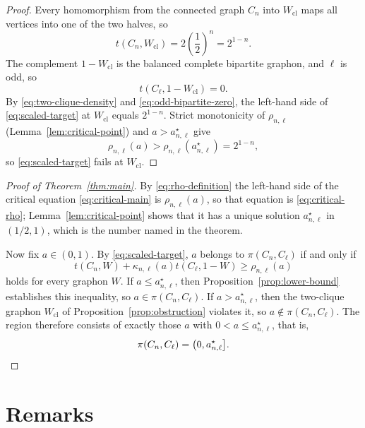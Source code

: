 \documentclass[11pt]{article}
\theoremstyle{definition}
\theoremstyle{remark}
\begin{document}
\begin{proof}
  Every homomorphism from the connected graph $C_n$ into $W_{\mathrm{cl}}$
  maps all vertices into one of the two halves, so
  \begin{equation}
    t(C_n,W_{\mathrm{cl}})
    =2\left(\frac12\right)^n
    =2^{1-n}.
    \label{eq:two-clique-density}
  \end{equation}
  The complement $1-W_{\mathrm{cl}}$ is the balanced complete bipartite
  graphon, and $\ell$ is odd, so
  \begin{equation}
    t(C_\ell,1-W_{\mathrm{cl}})=0.
    \label{eq:odd-bipartite-zero}
  \end{equation}
  By \eqref{eq:two-clique-density} and \eqref{eq:odd-bipartite-zero}, the
  left-hand side of \eqref{eq:scaled-target} at $W_{\mathrm{cl}}$ equals
  $2^{1-n}$.  Strict monotonicity of $\rho_{n,\ell}$
  (Lemma~\ref{lem:critical-point}) and $a>a_{n,\ell}^{\star}$ give
  \[
    \rho_{n,\ell}(a)
    >\rho_{n,\ell}(a_{n,\ell}^{\star})
    =2^{1-n},
  \]
  so \eqref{eq:scaled-target} fails at $W_{\mathrm{cl}}$.
\end{proof}

\begin{proof}[Proof of Theorem~\ref{thm:main}]
  By \eqref{eq:rho-definition} the left-hand side of the critical equation
  \eqref{eq:critical-main} is $\rho_{n,\ell}(a)$, so that equation is
  \eqref{eq:critical-rho}; Lemma~\ref{lem:critical-point} shows that it has a
  unique solution $a_{n,\ell}^{\star}$ in $(1/2,1)$, which is the number
  named in the theorem.

  Now fix $a\in(0,1)$.  By \eqref{eq:scaled-target}, $a$ belongs to
  $\pi(C_n,C_\ell)$ if and only if
  \[
    t(C_n,W)+\kappa_{n,\ell}(a)t(C_\ell,1-W)\ge\rho_{n,\ell}(a)
  \]
  holds for every graphon $W$.  If $a\le a_{n,\ell}^{\star}$, then
  Proposition~\ref{prop:lower-bound} establishes this inequality, so
  $a\in\pi(C_n,C_\ell)$.  If $a>a_{n,\ell}^{\star}$, then the two-clique
  graphon $W_{\mathrm{cl}}$ of Proposition~\ref{prop:obstruction} violates
  it, so $a\notin\pi(C_n,C_\ell)$.  The region therefore consists of exactly
  those $a$ with $0<a\le a_{n,\ell}^{\star}$, that is,
  \[
    \pi(C_n,C_\ell)=\bigl(0,a_{n,\ell}^{\star}\bigr].
    \qedhere
  \]
\end{proof}

\section{Remarks}
\end{document}
